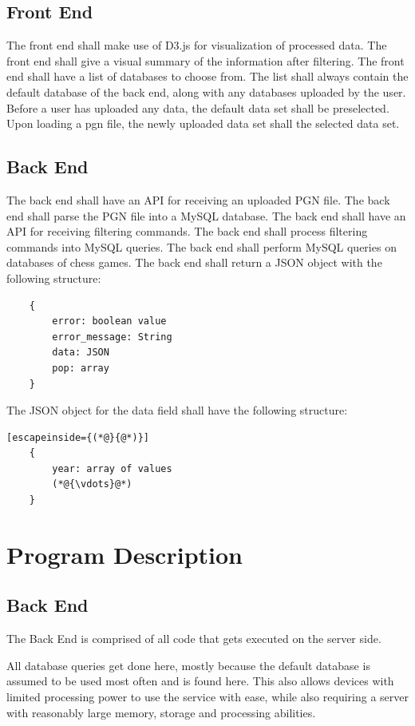 \documentclass{article}
\begin{document}
\subsection{Front End}
The front end shall make use of D3.js for visualization of processed data.
The front end shall give a visual summary of the information after filtering.
The front end shall have a list of databases to choose from.  The list
shall always contain the default database of the back end, along with
any databases uploaded by the user.
Before a user has uploaded any data, the default data set shall be preselected.
Upon loading a pgn file, the newly uploaded data set shall the selected
data set.

\subsection{Back End}
The back end shall have an API for receiving an uploaded PGN file.
The back end shall parse the PGN file into a MySQL database.
The back end shall have an API for receiving filtering commands.
The back end shall process filtering commands into MySQL queries.
The back end shall perform MySQL queries on databases of chess games.
The back end shall return a JSON object with the following structure:
\begin{lstlisting}
	{
		error: boolean value
		error_message: String
		data: JSON
		pop: array
	}
\end{lstlisting}
The JSON object for the data field shall have the following structure:
\begin{lstlisting}[escapeinside={(*@}{@*)}]
	{
		year: array of values
		(*@{\vdots}@*)
	}
\end{lstlisting}

\section{Program Description}

\subsection{Back End}
The Back End is comprised of all code that gets executed on the server side.

All database queries get done here, mostly because the default database is
assumed to be used most often and is found here. This also allows devices
with limited processing power to use the service with ease, while also
requiring a server with reasonably large memory, storage and
processing abilities.
\end{document}
